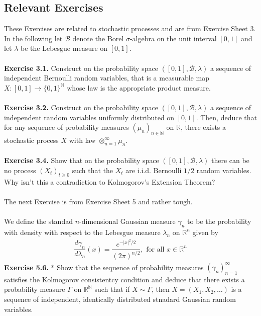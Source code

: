 \documentclass[11pt,a4paper, final]{article}
\theoremstyle{definition}
\begin{document}
\subsection{Relevant Exercises}
These Exercises are related to stochastic processes and are from Exercise Sheet 3. In the following let $\mathcal{B}$ denote the Borel $\sigma$-algebra on the unit interval $[0,1]$ and let $\lambda$ be the Lebesgue measure on $[0,1]$. \\
\\
\textbf{Exercise 3.1.} Construct on the probability space $([0,1], \mathcal{B}, \lambda)$ a sequence of independent Bernoulli random variables, that is a measurable map $X: [0,1] \to \lbrace 0,1 \rbrace^\mathbb{N}$ whose law is the appropriate product measure.
\\\\
\textbf{Exercise 3.2.} Construct on the probability space $([0,1], \mathcal{B}, \lambda)$ a sequence of independent random variables uniformly distributed on $[0,1]$. Then, deduce that for any sequence of probability measures $( \mu_n)_{n \in \mathbb{N}}$ on $\mathbb{R}$, there exists a stochastic process $X$ with law $\otimes_{n=1}^\infty \mu_n$. 
\\\\
\textbf{Exercise 3.4.} Show that on the probability space $([0,1], \mathcal{B}, \lambda)$ there can be no process $(X_t)_{t \geq 0}$ such that the $X_t$ are i.i.d. Bernoulli $1/2$ random variables. Why isn't this a contradiction to Kolmogorov's Extension Theorem?
\\\\
The next Exercise is from Exercise Sheet 5 and rather tough. 
\\\\
We define the standad $n$-dimensional Gaussian measure $\gamma_n$ to be the probability with density with respect to the Lebesgue measure $\lambda_n$ on $\mathbb{R}^n$ given by 
\begin{align*}
\dfrac{d \gamma_n}{d \lambda_n}(x) = \dfrac{e^{-|x|^2/2}}{(2 \pi)^{n/2}}, \text{ for all } x \in \mathbb{R}^n 
\end{align*}
\textbf{Exercise 5.6.} * Show that the sequence of probability measures $( \gamma_n)_{n=1}^\infty$ satisfies the Kolmogorov consistentcy condition and deduce that there exists a probability measure $\Gamma$ on $\mathbb{R}^\mathbb{N}$ such that if $X \sim \Gamma$, then $X=(X_1, X_2, \dots )$ is a sequence of independent, identically distributed stnadard Gaussian random variables. 
\newpage
\end{document}
